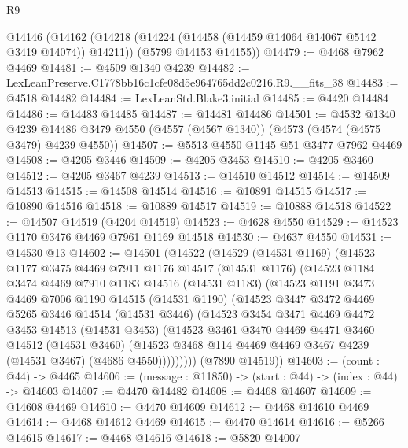 \begin{lexlean}{R9}
\begin{coremodule}
  @14146
    (@14162
      (@14218 (@14224 (@14458 (@14459 @14064 @14067 @5142 @3419 @14074)) @14211))
      (@5799 @14153 @14155))
@14479 := @4468 @7962 @4469
@14481 := @4509 @1340 @4239
@14482 := LexLeanPreserve.C1778bb16c1cfe08d5e964765dd2c0216.R9.__fits_38
@14483 := @4518 @14482
@14484 := LexLeanStd.Blake3.initial
@14485 := @4420 @14484
@14486 := @14483 @14485
@14487 := @14481 @14486
@14501 := @4532
    @1340
    @4239
    @14486
    @3479
    @4550
    (@4557 (@4567 @1340))
    (@4573 (@4574 (@4575 @3479) @4239 @4550))
@14507 := @5513 @4550 @1145 @51 @3477 @7962 @4469
@14508 := @4205 @3446
@14509 := @4205 @3453
@14510 := @4205 @3460
@14512 := @4205 @3467 @4239
@14513 := @14510 @14512
@14514 := @14509 @14513
@14515 := @14508 @14514
@14516 := @10891 @14515
@14517 := @10890 @14516
@14518 := @10889 @14517
@14519 := @10888 @14518
@14522 := @14507 @14519 (@4204 @14519)
@14523 := @4628 @4550
@14529 := @14523 @1170 @3476 @4469 @7961 @1169 @14518
@14530 := @4637 @4550
@14531 := @14530 @13
@14602 := @14501
    (@14522
      (@14529
        (@14531 @1169)
        (@14523
          @1177
          @3475
          @4469
          @7911
          @1176
          @14517
          (@14531 @1176)
          (@14523
            @1184
            @3474
            @4469
            @7910
            @1183
            @14516
            (@14531 @1183)
            (@14523
              @1191
              @3473
              @4469
              @7006
              @1190
              @14515
              (@14531 @1190)
              (@14523
                @3447
                @3472
                @4469
                @5265
                @3446
                @14514
                (@14531 @3446)
                (@14523
                  @3454
                  @3471
                  @4469
                  @4472
                  @3453
                  @14513
                  (@14531 @3453)
                  (@14523
                    @3461
                    @3470
                    @4469
                    @4471
                    @3460
                    @14512
                    (@14531 @3460)
                    (@14523 @3468 @114 @4469 @4469 @3467 @4239 (@14531 @3467) (@4686 @4550)))))))))
      (@7890 @14519))
@14603 := (count : @44) -> @4465
@14606 := (message : @11850) -> (start : @44) -> (index : @44) -> @14603
@14607 := @4470 @14482
@14608 := @4468 @14607
@14609 := @14608 @4469
@14610 := @4470 @14609
@14612 := @4468 @14610 @4469
@14614 := @4468 @14612 @4469
@14615 := @4470 @14614
@14616 := @5266 @14615
@14617 := @4468 @14616
@14618 := @5820 @14007

\end{coremodule}
\end{lexlean}
